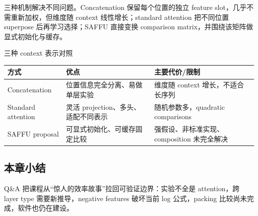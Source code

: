 三种机制解决不同问题。Concatenation 保留每个位置的独立 feature slot，几乎不需重新加权，但维度随 context 线性增长；standard attention 把不同位置 superpose 后再学习选择；SAFFU 直接变换 comparison matrix，并围绕该矩阵做显式初始化与缓存。

\begin{knowledgebox}{三种 context 表示对照}
\begin{tabularx}{\textwidth}{L{0.19\textwidth} L{0.25\textwidth} X}
\toprule
方式 & 优点 & 主要代价/限制 \\
\midrule
Concatenation & 位置信息完全分离、易做单层实验 & 维度随 context 增长，不适合长序列 \\
Standard attention & 灵活 projection、多头、适配不同表示 & 随机参数多，quadratic comparisons \\
SAFFU proposal & 可显式初始化、可缓存固定比较 & 强假设、非标准实现、composition 未完全解决 \\
\bottomrule
\end{tabularx}
\end{knowledgebox}

\subsection{本章小结}

Q\&A 把课程从“惊人的效率故事”拉回可验证边界：实验不全是 attention，跨 layer type 需要新推导，negative features 破坏当前 log 公式，packing 比较尚未完成，软件也仍在建设。

